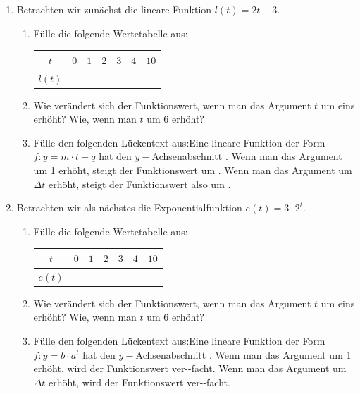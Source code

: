 \documentclass[11pt,oneside]{article}
\begin{document}
	\begin{aufgabe}
		\begin{enumerate}
			\item Betrachten wir zunächst die lineare Funktion $l(t)=2t+3$.
			\begin{enumerate}[label=\alph*)]
				\item Fülle die folgende Wertetabelle aus:
				\begin{table}[H]
					\centering
					\begin{tabular}{c|p{10mm}|p{10mm}|p{10mm}|p{10mm}|p{10mm}|p{10mm}}
						$t$ & $0$ & $1$ & $2$ & $3$ & $4$ & $10$\\\hline
						$l(t)$ & & & & &
					\end{tabular}
				\end{table}
				\item Wie verändert sich der Funktionswert, wenn man das Argument $t$ um eins erhöht? Wie, wenn man $t$ um 6 erhöht?
				\item Fülle den folgenden Lückentext aus:\newline Eine lineare Funktion der Form $f:y=m\cdot t+q$ hat den $y-$Achsenabschnitt . Wenn man das Argument um 1 erhöht, steigt der Funktionswert um . Wenn man das Argument um $\Delta t$ erhöht, steigt der Funktionswert also um \gap{2}.
			\end{enumerate}
		\end{enumerate}
		\newpage
		\begin{enumerate}\setcounter{enumi}{1}
			\item Betrachten wir als nächstes die Exponentialfunktion $e(t)=3\cdot 2^t$.
			\begin{enumerate}[label=\alph*)]
				\item Fülle die folgende Wertetabelle aus:
				\begin{table}[H]
					\centering
					\begin{tabular}{c|p{10mm}|p{10mm}|p{10mm}|p{10mm}|p{10mm}|p{10mm}}
						$t$ & $0$ & $1$ & $2$ & $3$ & $4$ & $10$\\\hline
						$e(t)$ & & & & &
					\end{tabular}
				\end{table}
				\item Wie verändert sich der Funktionswert, wenn man das Argument $t$ um eins erhöht? Wie, wenn man $t$ um 6 erhöht?
				\item Fülle den folgenden Lückentext aus:\newline Eine lineare Funktion der Form $f:y=b\cdot a^t$ hat den $y-$Achsenabschnitt . Wenn man das Argument um 1 erhöht, wird der Funktionswert ver--facht. Wenn man das Argument um $\Delta t$ erhöht, wird der Funktionswert ver--facht.
			\end{enumerate}
		\end{enumerate}
	\end{aufgabe}
\end{document}

